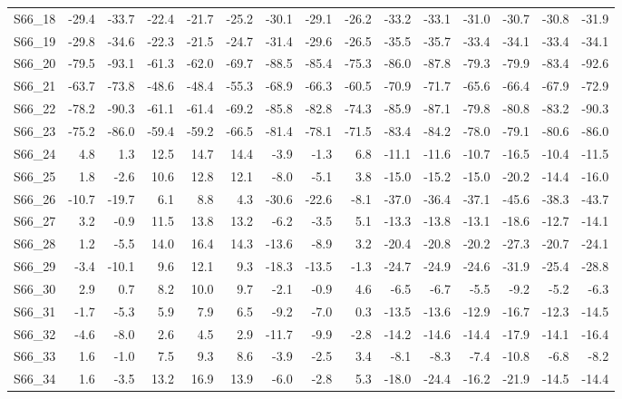 \begin{longtable}{lrrrrrrrrrrrrrr}
S66\_18 & -29.4 & -33.7 & -22.4 & -21.7 & -25.2 & -30.1 & -29.1 & -26.2 & -33.2 & -33.1 & -31.0 & -30.7 & -30.8 & -31.9 \\
S66\_19 & -29.8 & -34.6 & -22.3 & -21.5 & -24.7 & -31.4 & -29.6 & -26.5 & -35.5 & -35.7 & -33.4 & -34.1 & -33.4 & -34.1 \\
S66\_20 & -79.5 & -93.1 & -61.3 & -62.0 & -69.7 & -88.5 & -85.4 & -75.3 & -86.0 & -87.8 & -79.3 & -79.9 & -83.4 & -92.6 \\
S66\_21 & -63.7 & -73.8 & -48.6 & -48.4 & -55.3 & -68.9 & -66.3 & -60.5 & -70.9 & -71.7 & -65.6 & -66.4 & -67.9 & -72.9 \\
S66\_22 & -78.2 & -90.3 & -61.1 & -61.4 & -69.2 & -85.8 & -82.8 & -74.3 & -85.9 & -87.1 & -79.8 & -80.8 & -83.2 & -90.3 \\
S66\_23 & -75.2 & -86.0 & -59.4 & -59.2 & -66.5 & -81.4 & -78.1 & -71.5 & -83.4 & -84.2 & -78.0 & -79.1 & -80.6 & -86.0 \\
S66\_24 & 4.8 & 1.3 & 12.5 & 14.7 & 14.4 & -3.9 & -1.3 & 6.8 & -11.1 & -11.6 & -10.7 & -16.5 & -10.4 & -11.5 \\
S66\_25 & 1.8 & -2.6 & 10.6 & 12.8 & 12.1 & -8.0 & -5.1 & 3.8 & -15.0 & -15.2 & -15.0 & -20.2 & -14.4 & -16.0 \\
S66\_26 & -10.7 & -19.7 & 6.1 & 8.8 & 4.3 & -30.6 & -22.6 & -8.1 & -37.0 & -36.4 & -37.1 & -45.6 & -38.3 & -43.7 \\
S66\_27 & 3.2 & -0.9 & 11.5 & 13.8 & 13.2 & -6.2 & -3.5 & 5.1 & -13.3 & -13.8 & -13.1 & -18.6 & -12.7 & -14.1 \\
S66\_28 & 1.2 & -5.5 & 14.0 & 16.4 & 14.3 & -13.6 & -8.9 & 3.2 & -20.4 & -20.8 & -20.2 & -27.3 & -20.7 & -24.1 \\
S66\_29 & -3.4 & -10.1 & 9.6 & 12.1 & 9.3 & -18.3 & -13.5 & -1.3 & -24.7 & -24.9 & -24.6 & -31.9 & -25.4 & -28.8 \\
S66\_30 & 2.9 & 0.7 & 8.2 & 10.0 & 9.7 & -2.1 & -0.9 & 4.6 & -6.5 & -6.7 & -5.5 & -9.2 & -5.2 & -6.3 \\
S66\_31 & -1.7 & -5.3 & 5.9 & 7.9 & 6.5 & -9.2 & -7.0 & 0.3 & -13.5 & -13.6 & -12.9 & -16.7 & -12.3 & -14.5 \\
S66\_32 & -4.6 & -8.0 & 2.6 & 4.5 & 2.9 & -11.7 & -9.9 & -2.8 & -14.2 & -14.6 & -14.4 & -17.9 & -14.1 & -16.4 \\
S66\_33 & 1.6 & -1.0 & 7.5 & 9.3 & 8.6 & -3.9 & -2.5 & 3.4 & -8.1 & -8.3 & -7.4 & -10.8 & -6.8 & -8.2 \\
S66\_34 & 1.6 & -3.5 & 13.2 & 16.9 & 13.9 & -6.0 & -2.8 & 5.3 & -18.0 & -24.4 & -16.2 & -21.9 & -14.5 & -14.4 \\

\end{longtable}
